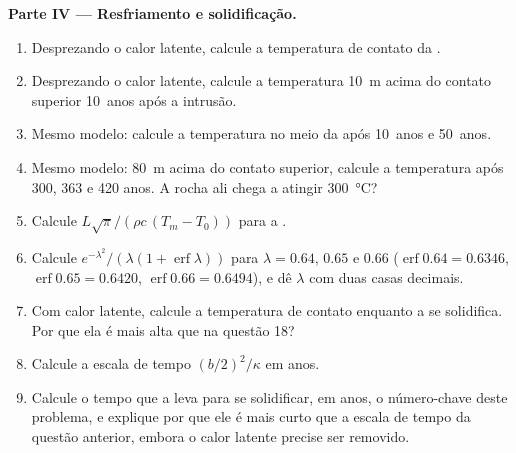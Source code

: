 \begin{problem}
\noindent\textbf{Parte IV --- Resfriamento e solidificação.}
\begin{enumerate}[resume]
\item Desprezando o calor latente, calcule a temperatura de contato da .
\item Desprezando o calor latente, calcule a temperatura \qty{10}{m} acima do contato
superior \num{10}~anos após a intrusão.
\item Mesmo modelo: calcule a temperatura no meio da  após
\num{10}~anos e \num{50}~anos.
\item Mesmo modelo: \qty{80}{m} acima do contato superior, calcule a temperatura após
\num{300}, \num{363} e \num{420} anos. A rocha ali chega a atingir
\qty{300}{\celsius}?
\item Calcule $L\sqrt\pi/(\rho c\,(T_m - T_0))$ para a .
\item Calcule $e^{-\lambda^2}/(\lambda(1 + \operatorname{erf}\lambda))$ para $\lambda = 0.64$,
$0.65$ e $0.66$ ($\operatorname{erf}0.64 = 0.6346$, $\operatorname{erf}0.65 = 0.6420$,
$\operatorname{erf}0.66 = 0.6494$), e dê $\lambda$ com duas casas decimais.
\item Com calor latente, calcule a temperatura de contato enquanto a 
se solidifica. Por que ela é mais alta que na questão 18?
\item Calcule a escala de tempo $(b/2)^2/\kappa$ em anos.
\item Calcule o tempo que a  leva para se solidificar, em anos, o número-chave deste
problema, e explique por que ele é mais curto que a escala de tempo da questão
anterior, embora o calor latente precise ser removido.
\end{enumerate}
\end{problem}

